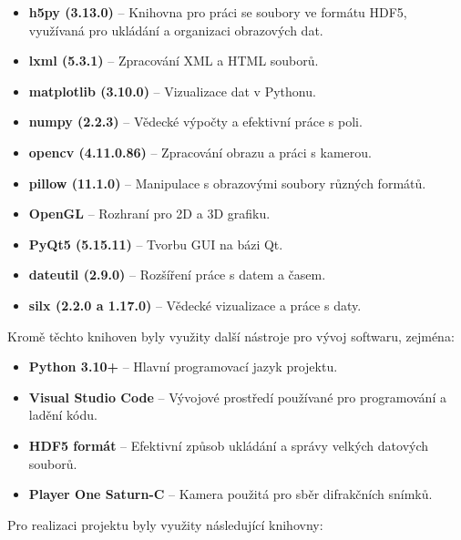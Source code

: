 \documentclass{article}
\begin{document}
\begin{itemize}
    \item \textbf{h5py (3.13.0)} – Knihovna pro práci se soubory ve formátu HDF5, využívaná pro ukládání a organizaci obrazových dat.
    \item \textbf{lxml (5.3.1)} – Zpracování XML a HTML souborů.
    \item \textbf{matplotlib (3.10.0)} – Vizualizace dat v Pythonu.
    \item \textbf{numpy (2.2.3)} – Vědecké výpočty a efektivní práce s poli.
    \item \textbf{opencv (4.11.0.86)} – Zpracování obrazu a práci s kamerou.
    \item \textbf{pillow (11.1.0)} – Manipulace s obrazovými soubory různých formátů.
    \item \textbf{OpenGL} – Rozhraní pro 2D a 3D grafiku.
    \item \textbf{PyQt5 (5.15.11)} – Tvorbu GUI na bázi Qt.
    \item \textbf{dateutil (2.9.0)} – Rozšíření práce s datem a časem.
    \item \textbf{silx (2.2.0 a 1.17.0)} – Vědecké vizualizace a práce s daty.
\end{itemize}

Kromě těchto knihoven byly využity další nástroje pro vývoj softwaru, zejména:

\begin{itemize}
    \item \textbf{Python 3.10+} – Hlavní programovací jazyk projektu.
    \item \textbf{Visual Studio Code} – Vývojové prostředí používané pro programování a ladění kódu.
    \item \textbf{HDF5 formát} – Efektivní způsob ukládání a správy velkých datových souborů.
    \item \textbf{Player One Saturn-C} – Kamera použitá pro sběr difrakčních snímků.
\end{itemize}


Pro realizaci projektu byly využity následující knihovny:
\end{document}
